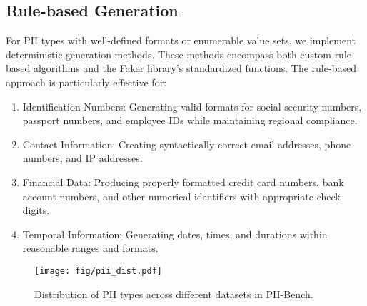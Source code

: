 \subsection{Rule-based Generation}
For PII types with well-defined formats or enumerable value sets, we implement deterministic generation methods. These methods encompass both custom rule-based algorithms and the Faker library's standardized functions. The rule-based approach is particularly effective for:

\begin{enumerate}
    \item Identification Numbers: Generating valid formats for social security numbers, passport numbers, and employee IDs while maintaining regional compliance.
    \item Contact Information: Creating syntactically correct email addresses, phone numbers, and IP addresses.
    \item Financial Data: Producing properly formatted credit card numbers, bank account numbers, and other numerical identifiers with appropriate check digits.
    \item Temporal Information: Generating dates, times, and durations within reasonable ranges and formats.
\end{enumerate}

\begin{figure}[t]
  \texttt{[image: fig/pii\_dist.pdf]}
  \caption{Distribution of PII types across different datasets in PII-Bench.}
  \label{fig:pii_dist}
\end{figure}

